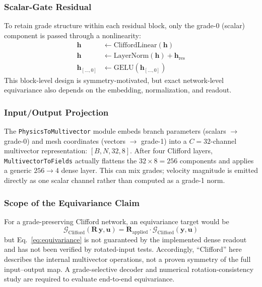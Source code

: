 \documentclass[journal]{IEEEtran}
\newcommand{\added}[1]{#1}
\begin{document}
\subsubsection{Scalar-Gate Residual}
To retain grade structure within each residual block, only the grade-0 (scalar) component is passed through a nonlinearity:
\begin{align}
\bm{h} &\leftarrow \text{CliffordLinear}(\bm{h}) \\
\bm{h} &\leftarrow \text{LayerNorm}(\bm{h}) + \bm{h}_\text{res} \\
\bm{h}_{[\ldots, 0]} &\leftarrow \text{GELU}(\bm{h}_{[\ldots, 0]}) \label{eq:scalar_gate}
\end{align}
 \added{This block-level design is symmetry-motivated, but exact network-level equivariance also depends on the embedding, normalization, and readout.}

\subsubsection{Input/Output Projection}
The \texttt{PhysicsToMultivector} module embeds branch parameters (scalars $\to$ grade-0) and mesh coordinates (vectors $\to$ grade-1) into a $C = 32$-channel multivector representation: $[B,N,32,8]$. After four Clifford layers,  \added{\texttt{MultivectorToFields} actually flattens the $32\times8=256$ components and applies a generic $256\to4$ dense layer. This can mix grades; velocity magnitude is emitted directly as one scalar channel rather than computed as a grade-1 norm.}

\subsubsection{Scope of the Equivariance Claim}
 \added{For a grade-preserving Clifford network, an equivariance target would be}
 {
\begin{equation}
\mathcal{G}_\text{Clifford}(\bm{R}\,\bm{y}, \bm{u}) = \bm{R}_\text{applied} \cdot \mathcal{G}_\text{Clifford}(\bm{y}, \bm{u})
\label{eq:equivariance}
\end{equation}}
\added{but Eq.~\eqref{eq:equivariance} is not guaranteed by the implemented dense readout and has not been verified by rotated-input tests. Accordingly, ``Clifford'' here describes the internal multivector operations, not a proven symmetry of the full input--output map. A grade-selective decoder and numerical rotation-consistency study are required to evaluate end-to-end equivariance.}
\end{document}

